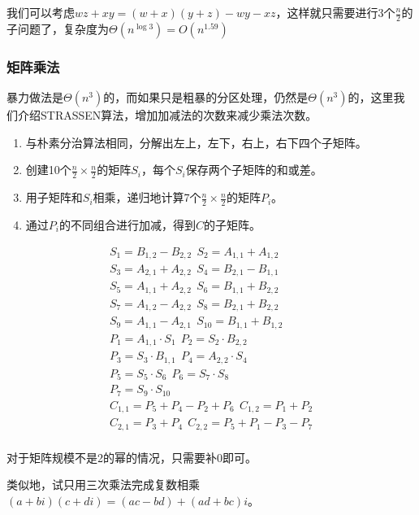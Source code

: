 \documentclass[./../main.tex]{subfiles}
\begin{document}
我们可以考虑$wz+xy=(w+x)(y+z)-wy-xz$，这样就只需要进行3个$\frac{n}{2}$的子问题了，复杂度为$\Theta(n^{\log 3})=O(n^{1.59})$

\subsubsection{矩阵乘法}
暴力做法是$\Theta(n^3)$的，而如果只是粗暴的分区处理，仍然是$\Theta(n^3)$的，这里我们介绍STRASSEN算法，增加加减法的次数来减少乘法次数。

\begin{enumerate}
    \item 与朴素分治算法相同，分解出左上，左下，右上，右下四个子矩阵。
    \item 创建10个$\frac{n}{2}\times\frac{n}{2}$的矩阵$S_{i}$，每个$S_{i}$保存两个子矩阵的和或差。
    \item 用子矩阵和$S_{i}$相乘，递归地计算7个$\frac{n}{2}\times\frac{n}{2}$的矩阵$P_{i}$。
    \item 通过$P_{i}$的不同组合进行加减，得到$C$的子矩阵。
\end{enumerate}

$$
\begin{array}{l}
    S_{1} = B_{1,2} - B_{2,2} ~~
    S_{2} = A_{1,1} + A_{1,2} \\
    S_{3} = A_{2,1} + A_{2,2} ~~
    S_{4} = B_{2,1} - B_{1,1} \\
    S_{5} = A_{1,1} + A_{2,2} ~~
    S_{6} = B_{1,1} + B_{2,2} \\
    S_{7} = A_{1,2} - A_{2,2} ~~
    S_{8} = B_{2,1} + B_{2,2} \\
    S_{9} = A_{1,1} - A_{2,1} ~~
    S_{10} = B_{1,1} + B_{1,2}\\
    P_{1} = A_{1,1} \cdot S_{1} ~~
    P_{2} = S_{2} \cdot B_{2,2} \\
    P_{3} = S_{3} \cdot B_{1,1} ~~
    P_{4} = A_{2,2} \cdot S_{4} \\
    P_{5} = S_{5} \cdot S_{6} ~~
    P_{6} = S_{7} \cdot S_{8} \\
    P_{7} = S_{9} \cdot S_{10}\\
    C_{1,1} = P_{5} + P_{4} - P_{2} + P_{6} ~~
    C_{1,2} = P_{1} + P_{2} \\
    C_{2,1} = P_{3} + P_{4} ~~
    C_{2,2} = P_{5} + P_{1} - P_{3} - P_{7}\\
\end{array}
$$

对于矩阵规模不是2的幂的情况，只需要补0即可。

类似地，试只用三次乘法完成复数相乘 $(a+bi)(c+di)=(ac-bd)+(ad+bc)i$。
\end{document}
